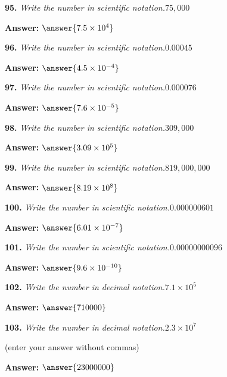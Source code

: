 \documentclass{ximera}
\begin{document}
\begin{problem}
\textbf{95.} \emph{Write the number in scientific notation.}\quad $75{,}000$

\textbf{Answer:} $\answer{7.5\times 10^4}$
\end{problem}

\begin{problem}
\textbf{96.} \emph{Write the number in scientific notation.}\quad $0.00045$

\textbf{Answer:} $\answer{4.5 \times 10^{-4}}$
\end{problem}

\begin{problem}
\textbf{97.} \emph{Write the number in scientific notation.}\quad $0.000076$

\textbf{Answer:} $\answer{7.6\times 10^{-5}}$
\end{problem}

\begin{problem}
\textbf{98.} \emph{Write the number in scientific notation.}\quad $309{,}000$

\textbf{Answer:} $\answer{3.09 \times 10^{5}}$
\end{problem}

\begin{problem}
\textbf{99.} \emph{Write the number in scientific notation.}\quad $819{,}000{,}000$

\textbf{Answer:} $\answer{8.19\times 10^8}$
\end{problem}

\begin{problem}
\textbf{100.} \emph{Write the number in scientific notation.}\quad $0.000000601$

\textbf{Answer:} $\answer{6.01 \times 10^{-7}}$
\end{problem}

\begin{problem}
\textbf{101.} \emph{Write the number in scientific notation.}\quad $0.00000000096$

\textbf{Answer:} $\answer{9.6\times 10^{-10}}$
\end{problem}

\begin{problem}
\textbf{102.} \emph{Write the number in decimal notation.}\quad $7.1 \times 10^5$

\textbf{Answer:} $\answer{710000}$
\end{problem}

\begin{problem}
\textbf{103.} \emph{Write the number in decimal notation.}\quad $2.3 \times 10^7$

(enter your answer without commas)

\textbf{Answer:} $\answer{23000000}$
\end{problem}
\end{document}
